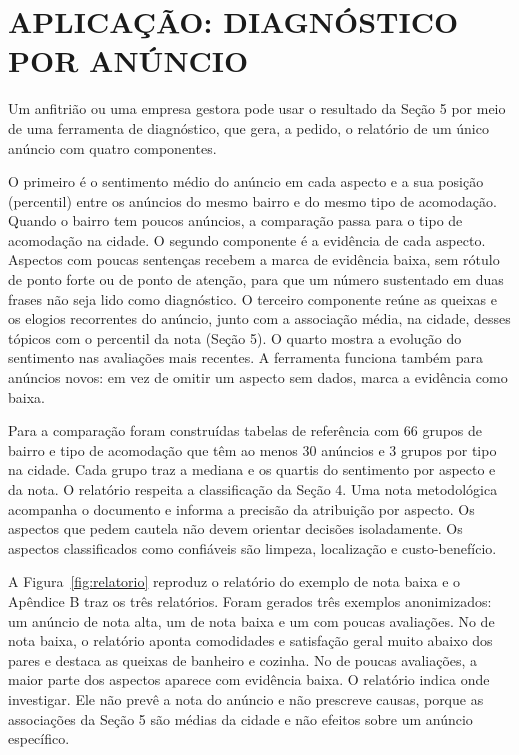 \section{APLICAÇÃO: DIAGNÓSTICO POR ANÚNCIO}

Um anfitrião ou uma empresa gestora pode usar o resultado da Seção 5 por meio de uma ferramenta de diagnóstico, que gera, a pedido, o relatório de um único anúncio com quatro componentes.

O primeiro é o sentimento médio do anúncio em cada aspecto e a sua posição (percentil) entre os anúncios do mesmo bairro e do mesmo tipo de acomodação. Quando o bairro tem poucos anúncios, a comparação passa para o tipo de acomodação na cidade. O segundo componente é a evidência de cada aspecto. Aspectos com poucas sentenças recebem a marca de evidência baixa, sem rótulo de ponto forte ou de ponto de atenção, para que um número sustentado em duas frases não seja lido como diagnóstico. O terceiro componente reúne as queixas e os elogios recorrentes do anúncio, junto com a associação média, na cidade, desses tópicos com o percentil da nota (Seção 5). O quarto mostra a evolução do sentimento nas avaliações mais recentes. A ferramenta funciona também para anúncios novos: em vez de omitir um aspecto sem dados, marca a evidência como baixa.

Para a comparação foram construídas tabelas de referência com 66 grupos de bairro e tipo de acomodação que têm ao menos 30 anúncios e 3 grupos por tipo na cidade. Cada grupo traz a mediana e os quartis do sentimento por aspecto e da nota. O relatório respeita a classificação da Seção 4. Uma nota metodológica acompanha o documento e informa a precisão da atribuição por aspecto. Os aspectos que pedem cautela não devem orientar decisões isoladamente. Os aspectos classificados como confiáveis são limpeza, localização e custo-benefício.

A Figura~\ref{fig:relatorio} reproduz o relatório do exemplo de nota baixa e o Apêndice B traz os três relatórios. Foram gerados três exemplos anonimizados: um anúncio de nota alta, um de nota baixa e um com poucas avaliações. No de nota baixa, o relatório aponta comodidades e satisfação geral muito abaixo dos pares e destaca as queixas de banheiro e cozinha. No de poucas avaliações, a maior parte dos aspectos aparece com evidência baixa. O relatório indica onde investigar. Ele não prevê a nota do anúncio e não prescreve causas, porque as associações da Seção 5 são médias da cidade e não efeitos sobre um anúncio específico.

